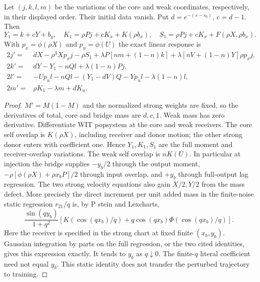 \documentclass[11pt]{article}
\begin{document}
\begin{proposition}\label{an04swpv1:response}
Let $(j,k,l,m)$ be the variations of the core and weak coordinates,
respectively, in their displayed order. Their initial data vanish.
Put $d=e^{-(s-s_0)}$, $c=d-1$. Then
\[
 Y_1=k+cY+b_y,\quad K_1=\rho Pj+cK_x+K(\rho b_x),\quad
 S_1=\rho Pj+cK_x+F(\rho X,\rho b_x).
\]
With $p_x=\phi(\rho X)$ and $p_u=\phi(U)$ the exact linear response is
\begin{align}
 2j'={}&dX-\rho^3 X p_x j-\rho S_1
  +\lambda P[nm+(1-n)k]+\lambda[nV+(1-n)Y]\rho p_xj,\nonumber\\
 2k'={}&dY-Y_1-nQl+\lambda(1-n)Pj,\nonumber\\
 2l'={}&-Up_u l-nQl-(Y_1-dV)Q-Yp_u l-\lambda(1-n)l,\nonumber\\
 2m'={}&\rho K_1-\lambda m+dK_u.\label{an04swpv1:linear}
\end{align}
\end{proposition}
\begin{proof}
$M'=M(1-M)$ and the normalized strong weights are fixed, so the
derivatives of total, core and bridge mass are $d,c,1$.
Weak mass has zero derivative. Differentiate WIT popsystem at the
core and weak receivers. The core self overlap is $K(\rho X)$,
including receiver and donor motion; the other strong donor enters
with coefficient one. Hence $Y_1,K_1,S_1$ are the full moment and
receiver-overlap variations. The weak self overlap is $nK(U)$.
In particular at injection the bridge supplies $-y_b/2$ through
the output moment, $-\rho[\phi(\rho X)+\rho x_bP]/2$ through input
overlap, and $+y_b$ through full-output lag regression. The two
strong velocity equations also gain $X/2,Y/2$ from the mass defect.
More precisely the direct increment per unit added mass in the
finite-noise static regression $r_{21}/q$ is, by P stein and Lexcharts,
\[
 \frac{\sin(qy_b)}{1+q^2}
 \left[K(\cos(qx_b)/q)+q\cos(qx_b)\Phi(\cos(qx_b)/q)\right].
\]
Here the receiver is specified in the strong chart at fixed finite
$(x_b,y_b)$. Gaussian integration by parts on the full regression,
or the two cited identities, gives this expression exactly.
It tends to $y_b$ as $q\downarrow0$. The finite-$q$ literal
coefficient need not equal $y_b$. This static identity does not transfer
the perturbed trajectory to training.
\end{proof}
\end{document}
